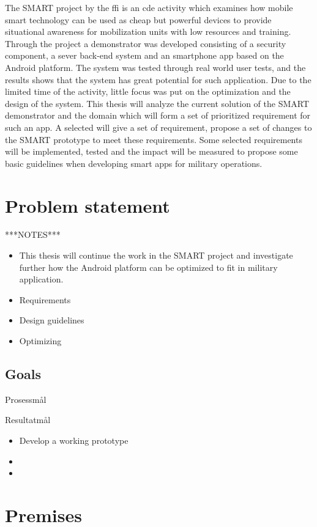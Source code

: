 The SMART project by the \gls{ffi} is an \gls{cde} activity which examines how mobile smart technology can be used as cheap but powerful devices to provide situational awareness for mobilization units with low resources and training\cite{ep1667_bakgrunn}. Through the project a demonstrator was developed consisting of a security component, a sever back-end system and an smartphone app based on the Android platform. The system was tested through real world user tests, and the results shows that the system has great potential for such application. Due to the limited time of the activity, little focus was put on the optimization and the design of the system. This thesis will analyze the current solution of the SMART demonstrator and the domain which will form a set of prioritized requirement for such an app. A selected  will give a set of requirement, propose a set of changes to the SMART prototype to meet these requirements.  Some selected requirements will be implemented, tested and the impact will be measured to propose some basic guidelines when developing smart apps for military operations.

\section{Problem statement}
***NOTES***
\begin{itemize}
\item{This thesis will continue the work in the SMART project and investigate further how the Android platform can be optimized to fit in military application.}
\item{Requirements}
\item{Design guidelines}
\item{Optimizing}
\end{itemize}

\subsection{Goals}
Prosessmål

Resultatmål
\begin{itemize}
	\item{Develop a working prototype}
	\item{}
	\item{}
\end{itemize}

\section{Premises}

